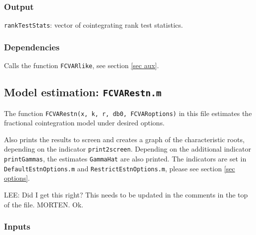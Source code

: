 \documentclass[12pt]{article}
\begin{document}
\subsubsection*{Output}


\texttt{rankTestStats}: vector of cointegrating rank test statistics.



\subsubsection*{Dependencies} 

Calls the function \texttt{FCVARlike}, see section \ref{sec aux}. 





\newpage

\subsection{Model estimation: \texttt{FCVARestn.m}\label{sec estn}}

The function \texttt{FCVARestn(x, k, r, db0, FCVARoptions)} in this file estimates the fractional cointegration model under desired options.

Also prints the results to screen and creates a graph of the characteristic roots, depending on the indicator \texttt{print2screen}. Depending on the additional indicator \texttt{printGammas}, the estimates \texttt{GammaHat} are also printed. The indicators are set in \texttt{DefaultEstnOptions.m} and \texttt{RestrictEstnOptions.m}, please see section \ref{sec options}.

LEE: Did I get this right? This needs to be updated in the comments in the top of the file.
MORTEN. Ok.


\subsubsection*{Inputs}
\end{document}
